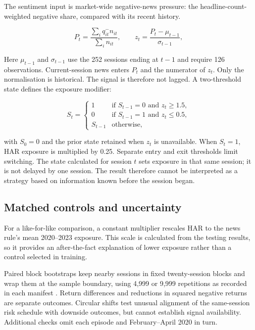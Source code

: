 The sentiment input is market-wide negative-news pressure: the
headline-count-weighted negative share, compared with its recent history.

\begin{equation}
 P_t=\frac{\sum_i q^{-}_{it}n_{it}}{\sum_i n_{it}},
 \qquad
 z_t=\frac{P_t-\mu_{t-1}}{\sigma_{t-1}},
 \label{eq:negative-pressure}
\end{equation}

\noindent Here $\mu_{t-1}$ and $\sigma_{t-1}$ use the 252 sessions ending at
$t-1$ and require 126 observations. Current-session news enters $P_t$ and the
numerator of $z_t$. Only the normalisation is historical. The signal is therefore
not lagged. A two-threshold state defines the exposure modifier:

\begin{equation}
 S_t=\begin{cases}
 1 & \text{if } S_{t-1}=0 \text{ and } z_t\geq 1.5,\\
 0 & \text{if } S_{t-1}=1 \text{ and } z_t\leq 0.5,\\
 S_{t-1} & \text{otherwise,}
 \end{cases}
 \label{eq:hysteresis}
\end{equation}

\noindent with $S_0=0$ and the prior state retained when $z_t$ is unavailable.
When $S_t=1$, HAR exposure is multiplied by 0.25. Separate entry and exit
thresholds limit switching. The state calculated for session $t$ sets exposure
in that same session; it is not delayed by one session. The result therefore
cannot be interpreted as a strategy based on information known before the
session began.

\subsection{Matched controls and uncertainty}

For a like-for-like comparison, a constant multiplier rescales HAR to the news
rule's mean 2020--2023 exposure. This scale is calculated from the testing
results, so it provides an after-the-fact explanation of lower exposure rather
than a control selected in training.

Paired block bootstraps keep nearby sessions in fixed twenty-session blocks and
wrap them at the sample boundary, using 4,999 or 9,999 repetitions as recorded
in each manifest \citep{kunsch1989}. Return differences and reductions in
squared negative returns are separate outcomes. Circular shifts test unusual
alignment of the same-session risk schedule with downside outcomes, but cannot
establish signal availability. Additional checks omit each episode and
February--April 2020 in turn.

